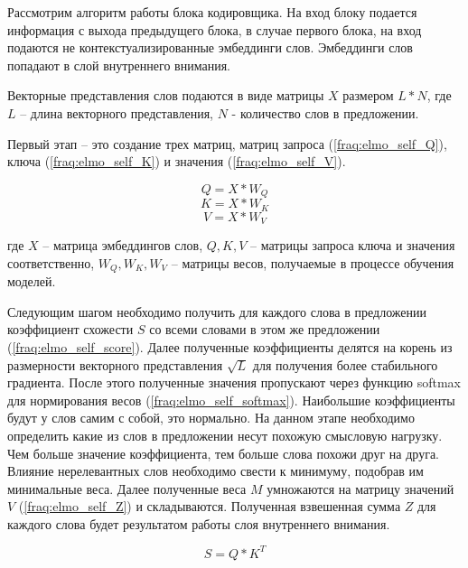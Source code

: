 \documentclass[a4paper,14pt]{article}
\begin{document}
Рассмотрим алгоритм работы блока кодировщика.
На вход блоку подается информация с выхода предыдущего блока, в случае первого блока, на вход подаются не контекстуализированные эмбеддинги слов.
Эмбеддинги слов попадают в слой внутреннего внимания.

Векторные представления слов подаются в виде матрицы $X$ размером $L*N$, где $L$ -- длина векторного представления, $N$ - количество слов в предложении.

Первый этап -- это создание трех матриц, матриц запроса (\ref{fraq:elmo_self_Q}), ключа (\ref{fraq:elmo_self_K}) и значения (\ref{fraq:elmo_self_V}).

\begin{equation}
	Q = X * W_Q
	\label{fraq:elmo_self_Q}
\end{equation}
\begin{equation}
	K = X * W_K
	\label{fraq:elmo_self_K}
\end{equation}
\begin{equation}
	V = X * W_V
	\label{fraq:elmo_self_V}
\end{equation}

где $X$ -- матрица эмбеддингов слов,
$Q, K, V$ -- матрицы запроса ключа и значения соответственно,
$W_Q, W_K, W_V$ -- матрицы весов, получаемые в процессе обучения моделей.

Следующим шагом необходимо получить для каждого слова в предложении коэффициент схожести $S$ со всеми словами в этом же предложении (\ref{fraq:elmo_self_score}).
Далее полученные коэффициенты делятся на корень из размерности векторного представления $\sqrt{L}$ для получения более стабильного градиента.
После этого полученные значения пропускают через функцию softmax для нормирования весов (\ref{fraq:elmo_self_softmax}).
Наибольшие коэффициенты будут у слов самим с собой, это нормально.
На данном этапе необходимо определить какие из слов в предложении несут похожую смысловую нагрузку.
Чем больше значение коэффициента, тем больше слова похожи друг на друга.
Влияние нерелевантных слов необходимо свести к минимуму, подобрав им минимальные веса.
Далее полученные веса $M$ умножаются на матрицу значений $V$ (\ref{fraq:elmo_self_Z}) и складываются.
Полученная взвешенная сумма $Z$ для каждого слова будет результатом работы слоя внутреннего внимания.

\begin{equation}
	S = Q * K^T
	\label{fraq:elmo_self_score}
\end{equation}
\end{document}
